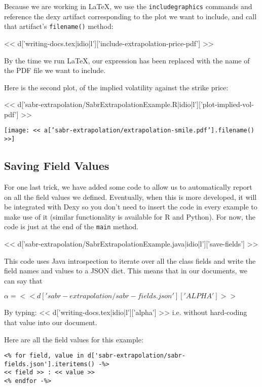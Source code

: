 Because we are working in \LaTeX, we use the \verb|includegraphics| commands
and reference the dexy artifact corresponding to the plot we want to include,
and call that artifact's \verb|filename()| method:

<< d['writing-docs.tex|idio|l']['include-extrapolation-price-pdf'] >>

By the time we run \LaTeX, our expression has been replaced with the name of
the PDF file we want to include.

Here is the second plot, of the implied volatility against the strike price:

<< d['sabr-extrapolation/SabrExtrapolationExample.R|idio|l']['plot-implied-vol-pdf'] >>

\texttt{[image: << a['sabr-extrapolation/extrapolation-smile.pdf'].filename() >>]}

\subsection{Saving Field Values}

For one last trick, we have added some code to allow us to automatically report
on all the field values we defined. Eventually, when this is more developed, it
will be integrated with Dexy so you don't need to insert the code in every
example to make use of it (similar functionality is available for R and
Python). For now, the code is just at the end of the \verb|main| method.

<< d['sabr-extrapolation/SabrExtrapolationExample.java|idio|l']['save-fields'] >>

This code uses Java introspection to iterate over all the class fields and
write the field names and values to a JSON dict. This means that in our
documents, we can say that

$\alpha=<<d['sabr-extrapolation/sabr-fields.json']['ALPHA']>>$

By typing: << d['writing-docs.tex|idio|l']['alpha'] >>
i.e. without hard-coding that value into our document.

Here are all the field values for this example:

\begin{Verbatim}
<% for field, value in d['sabr-extrapolation/sabr-fields.json'].iteritems() -%>
<< field >> : << value >>
<% endfor -%>
\end{Verbatim}

